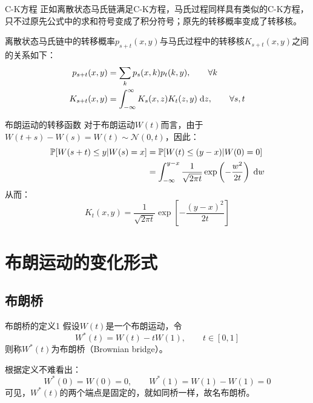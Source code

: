 \documentclass[t]{beamer}
\newcommand{\dif}{{\;\rm d}}
\renewcommand{\Pr}{\mathbb{P}}
\begin{document}
\begin{frame}{C-K方程}
  正如离散状态马氏链满足C-K方程，马氏过程同样具有类似的C-K方程，只不过原先公式中的求和符号变成了积分符号；原先的转移概率变成了转移核。
  
  离散状态马氏链中的转移概率$p_{s+t}(x,y)$与马氏过程中的转移核$K_{s+t}(x,y)$之间的关系如下：
  \begin{align*}
  p_{s+t}(x,y)&=\sum_k p_s(x,k)p_t(k,y), \qquad \forall k\\
  K_{s+t}(x,y)&=\int_{-\infty}^{\infty}K_s(x,z)K_t(z,y)\dif z, \qquad \forall s,t
  \end{align*}
\end{frame}


\begin{frame}{布朗运动的转移函数}
  对于布朗运动$W(t)$而言，由于$W(t+s)-W(s)=W(t)\sim \mathcal{N}(0,t)$，因此：
  \[\begin{split}
  \Pr\qty[W(s+t)\le y|W(s)=x]&=\Pr\qty[W(t)\le (y-x)|W(0)=0]\\
  &=\int^{y-x}_{-\infty} \frac{1}{\sqrt{2\pi t}}\exp\left(-\frac{w^2}{2t}\right)\dif w
  \end{split} \]
  从而： 
  \begin{equation*}
  K_t(x,y)=\frac{1}{\sqrt{2\pi t}}\exp\left[-\frac{(y-x)^2}{2t}\right]
  \end{equation*} 
\end{frame}


\section{布朗运动的变化形式}

\subsection{布朗桥}
\begin{frame}{布朗桥的定义1}
  假设$W(t)$是一个布朗运动，令
  \begin{equation*}
  W^*(t)=W(t)-tW(1),\qquad t\in[0,1]
  \end{equation*}
  则称$W^*(t)$为布朗桥（Brownian bridge）。

  根据定义不难看出：
\begin{equation*}
W^*(0)=W(0)=0,\qquad W^*(1)=W(1)-W(1)=0
\end{equation*}
可见，$W^*(t)$的两个端点是固定的，就如同桥一样，故名布朗桥。
\end{frame}
\end{document}
